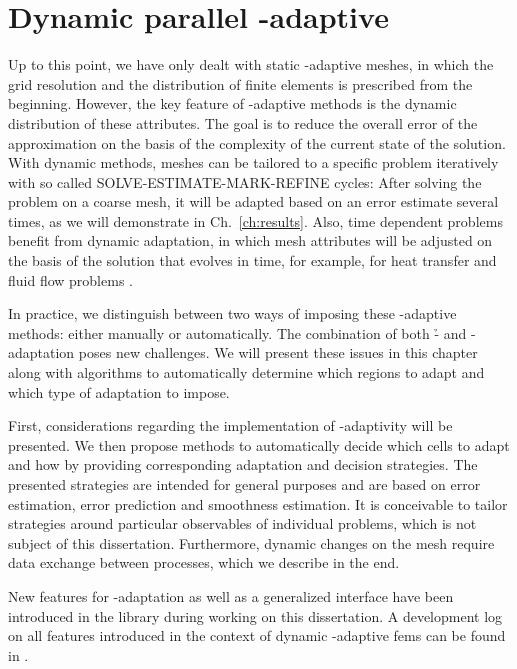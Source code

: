 \chapter{Dynamic parallel \hp-adaptive }
\label{ch:dynamic}
\glsresetall

Up to this point, we have only dealt with static \hp-adaptive meshes, in which the grid resolution and the distribution of finite elements is prescribed from the beginning. %
However, the key feature of \hp-adaptive methods is the dynamic distribution of these attributes. The goal is to reduce the overall error of the approximation on the basis of the complexity of the current state of the solution. With dynamic methods, meshes can be tailored to a specific problem iteratively with so called SOLVE-ESTIMATE-MARK-REFINE cycles: After solving the problem on a coarse mesh, it will be adapted based on an error estimate several times, as we will demonstrate in Ch.~\ref{ch:results}. Also, time dependent problems benefit from dynamic adaptation, in which mesh attributes will be adjusted on the basis of the solution that evolves in time, for example, for heat transfer \textcite{dealiistep-26} and fluid flow problems \textcite{dealiistep-31}.

In practice, we distinguish between two ways of imposing these \hp-adaptive methods: either manually or automatically. The combination of both \h- and \p-adaptation poses new challenges. We will present these issues in this chapter along with algorithms to automatically determine which regions to adapt and which type of adaptation to impose.

First, considerations regarding the implementation of \hp-adaptivity will be presented. We then propose methods to automatically decide which cells to adapt and how by providing corresponding adaptation and decision strategies. The presented strategies are intended for general purposes and are based on error estimation, error prediction and smoothness estimation. It is conceivable to tailor strategies around particular observables of individual problems, which is not subject of this dissertation. Furthermore, dynamic changes on the mesh require data exchange between processes, which we describe in the end.

New features for \hp-adaptation as well as a generalized interface have been introduced in the \dealii{} library \textcite{dealii920} during working on this dissertation. A development log on all features introduced in the context of dynamic \hp-adaptive \glspl{fem} can be found in \cite{dealiiissue7515}.





